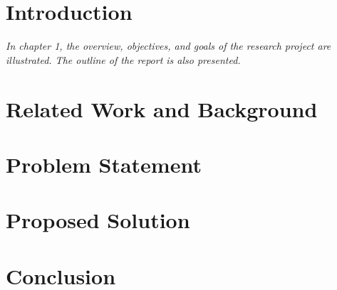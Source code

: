 \documentclass[12pt]{report}
\begin{document}

\setmainfont{Times New Roman}

\clearpage
{}

% 







% 

% 

\setcounter{tocdepth}{1}


\newpage

\listoffigures
\newpage


\chapter{Introduction}

\textit{In chapter 1, the overview, objectives, and goals of the research project are illustrated. The outline of the report is also presented.}









\chapter{Related Work and Background}
\label{ch:related-work-background}



% 

\chapter{Problem Statement}
\label{ch:problem-statement}



\chapter{Proposed Solution}
\label{ch:proposed-solution}



\chapter{Conclusion}
\label{ch:conclusion}






\end{document}
